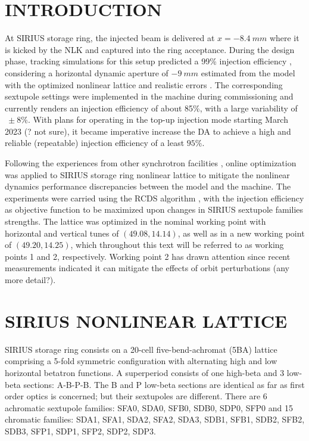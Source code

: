\documentclass[a4paper,
               keeplastbox,   %
               ]{jacow}
\begin{document}
\section{INTRODUCTION}
At SIRIUS storage ring, the injected beam is delivered at $x=-8.4~\unit{mm}$ where it is kicked by the NLK and captured into the ring acceptance. During the design phase, tracking simulations for this setup predicted a 99\% injection efficiency \cite{Liu:IPAC2016-THPMR011}, considering a horizontal dynamic aperture of $-9~\unit{mm}$  estimated from the model with the optimized nonlinear lattice and realistic errors \cite{deSá:IPAC2016-THPMR012}.  The corresponding sextupole settings were implemented in the machine during commissioning and currently renders an injection efficiency of about 85\%, with a large variability of $~\pm8\%$. With plans for operating in the top-up injection mode starting March 2023 (? not sure), it became imperative increase the DA to achieve a high and reliable (repeatable) injection efficiency of a least $95\%$. 

Following the experiences from other synchrotron facilities \cite{Huang:2015, Liuzzo:IPAC2016-THPMR015, Olsson:IPAC2018-WEPAL047, yang:ipac2022-tupopt064}, online optimization was applied to SIRIUS storage ring nonlinear lattice to mitigate the nonlinear dynamics performance discrepancies between the model and the machine. The experiments were carried using the RCDS algorithm \cite{Huang:2013}, with the injection efficiency as objective function to be maximized upon changes in SIRIUS sextupole families strengths. The lattice was optimized in the nominal working point with horizontal and vertical tunes of $(49.08, 14.14)$, as well as in a new working point of $(49.20, 14.25)$, which throughout this text will be referred to as working points 1 and 2, respectively. Working point 2 has drawn attention since recent measurements indicated it can mitigate the effects of orbit perturbations (any more detail?).   

\section{SIRIUS NONLINEAR LATTICE}
 SIRIUS storage ring consists on a 20-cell five-bend-achromat (5BA) lattice 
 comprising a 5-fold symmetric configuration with alternating high and low horizontal betatron functions. A superperiod consists of one high-beta and 3 low-beta sections: A-B-P-B. The B and P low-beta sections are identical as far as first order optics is concerned; but their sextupoles are different. There are 6 achromatic sextupole families: SFA0, SDA0, SFB0, SDB0, SDP0, SFP0 and 15 chromatic families: SDA1, SFA1, SDA2, SFA2, SDA3, SDB1, SFB1, SDB2, SFB2, SDB3, SFP1, SDP1, SFP2, SDP2, SDP3.
\end{document}
